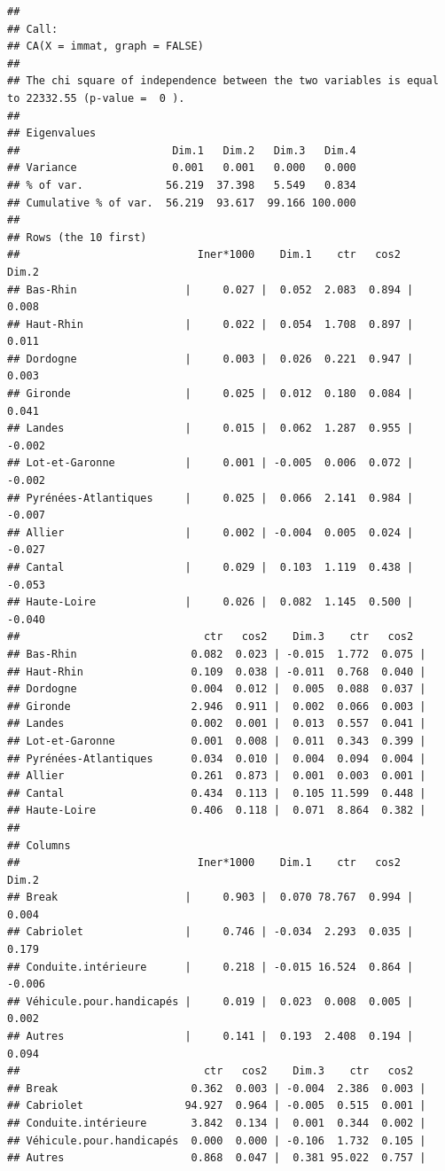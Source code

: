 \documentclass[]{book}
\begin{document}
\begin{verbatim}
## 
## Call:
## CA(X = immat, graph = FALSE) 
## 
## The chi square of independence between the two variables is equal to 22332.55 (p-value =  0 ).
## 
## Eigenvalues
##                        Dim.1   Dim.2   Dim.3   Dim.4
## Variance               0.001   0.001   0.000   0.000
## % of var.             56.219  37.398   5.549   0.834
## Cumulative % of var.  56.219  93.617  99.166 100.000
## 
## Rows (the 10 first)
##                            Iner*1000    Dim.1    ctr   cos2    Dim.2
## Bas-Rhin                 |     0.027 |  0.052  2.083  0.894 |  0.008
## Haut-Rhin                |     0.022 |  0.054  1.708  0.897 |  0.011
## Dordogne                 |     0.003 |  0.026  0.221  0.947 |  0.003
## Gironde                  |     0.025 |  0.012  0.180  0.084 |  0.041
## Landes                   |     0.015 |  0.062  1.287  0.955 | -0.002
## Lot-et-Garonne           |     0.001 | -0.005  0.006  0.072 | -0.002
## Pyrénées-Atlantiques     |     0.025 |  0.066  2.141  0.984 | -0.007
## Allier                   |     0.002 | -0.004  0.005  0.024 | -0.027
## Cantal                   |     0.029 |  0.103  1.119  0.438 | -0.053
## Haute-Loire              |     0.026 |  0.082  1.145  0.500 | -0.040
##                             ctr   cos2    Dim.3    ctr   cos2  
## Bas-Rhin                  0.082  0.023 | -0.015  1.772  0.075 |
## Haut-Rhin                 0.109  0.038 | -0.011  0.768  0.040 |
## Dordogne                  0.004  0.012 |  0.005  0.088  0.037 |
## Gironde                   2.946  0.911 |  0.002  0.066  0.003 |
## Landes                    0.002  0.001 |  0.013  0.557  0.041 |
## Lot-et-Garonne            0.001  0.008 |  0.011  0.343  0.399 |
## Pyrénées-Atlantiques      0.034  0.010 |  0.004  0.094  0.004 |
## Allier                    0.261  0.873 |  0.001  0.003  0.001 |
## Cantal                    0.434  0.113 |  0.105 11.599  0.448 |
## Haute-Loire               0.406  0.118 |  0.071  8.864  0.382 |
## 
## Columns
##                            Iner*1000    Dim.1    ctr   cos2    Dim.2
## Break                    |     0.903 |  0.070 78.767  0.994 |  0.004
## Cabriolet                |     0.746 | -0.034  2.293  0.035 |  0.179
## Conduite.intérieure      |     0.218 | -0.015 16.524  0.864 | -0.006
## Véhicule.pour.handicapés |     0.019 |  0.023  0.008  0.005 |  0.002
## Autres                   |     0.141 |  0.193  2.408  0.194 |  0.094
##                             ctr   cos2    Dim.3    ctr   cos2  
## Break                     0.362  0.003 | -0.004  2.386  0.003 |
## Cabriolet                94.927  0.964 | -0.005  0.515  0.001 |
## Conduite.intérieure       3.842  0.134 |  0.001  0.344  0.002 |
## Véhicule.pour.handicapés  0.000  0.000 | -0.106  1.732  0.105 |
## Autres                    0.868  0.047 |  0.381 95.022  0.757 |
\end{verbatim}
\end{document}
